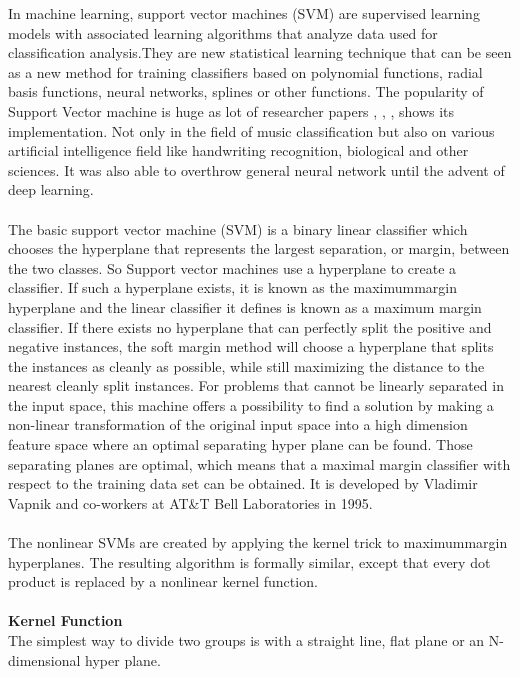 {In machine learning, support vector machines (SVM) are supervised learning models with 
associated learning algorithms that analyze data used for classification analysis.They are new statistical learning technique that can be seen as a new method for training
classifiers based on polynomial functions, radial basis functions, neural networks, splines or other functions. The popularity of Support Vector machine is huge as lot of researcher papers
\cite{Koerich2013}, \cite{Anglade2010}, \cite{Haggblade2011}, \cite{Kour2015} shows its implementation. Not only in the field of music classification but also on various artificial intelligence field like handwriting
recognition, biological and other sciences. It was also able to overthrow general neural network until the advent of deep learning.\\
\\
The basic support vector machine (SVM) is a binary linear classifier which chooses the hyperplane that represents the largest separation, or margin, between the two classes. So  Support vector machines use
a hyperplane to create a classifier. If such a hyperplane exists, it is known as the maximum­margin hyperplane and the linear classifier it defines is known as a maximum margin classifier. 
If there exists no hyperplane that can perfectly split the positive and negative instances, the soft 
margin method will choose a hyperplane that splits the instances as cleanly as possible, while still 
maximizing the distance to the nearest cleanly split instances. For problems that cannot be linearly separated in the input space, this machine offers a possibility to find a solution by making 
a non-linear transformation of the original input space into a high dimension feature space where an optimal separating hyper plane can be found. Those separating planes are optimal, which means
that a maximal margin classifier with respect to the training data set can be obtained. It is developed by Vladimir Vapnik and co-workers at AT\&T Bell Laboratories in 1995.\\
\\
The nonlinear SVMs are created by applying the kernel trick to maximum­margin hyperplanes. 
The resulting algorithm is formally similar, except that every dot product is replaced by a nonlinear kernel 
function.\\
\\
\textbf{Kernel Function}\\
The simplest way to divide two groups is with a straight line, flat plane or an N-dimensional hyper plane.
}
